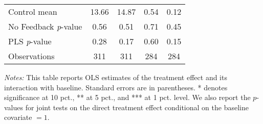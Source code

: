 \begin{table}[ht]
{\begin{threeparttable}
\begin{tabular}{l*{4}{c}}
Control mean    &    13.66         &    14.87         &     0.54         &     0.12         \\
No Feedback \emph{p}-value&     0.56         &     0.51         &     0.71         &     0.45         \\
PLS \emph{p}-value&     0.28         &     0.17         &     0.60         &     0.15         \\
Observations    &      311         &      311         &      284         &      284         \\
\bottomrule \end{tabular} \begin{tablenotes}[flushleft] \footnotesize \item \emph{Notes:} This table reports OLS estimates of the treatment effect and its interaction with baseline. Standard errors are in parentheses. * denotes significance at 10 pct., ** at 5 pct., and *** at 1 pct. level. We also report the \(p\)-values for joint tests on the direct treatment effect conditional on the baseline covariate $= 1$. \end{tablenotes} \end{threeparttable} } \end{table}

